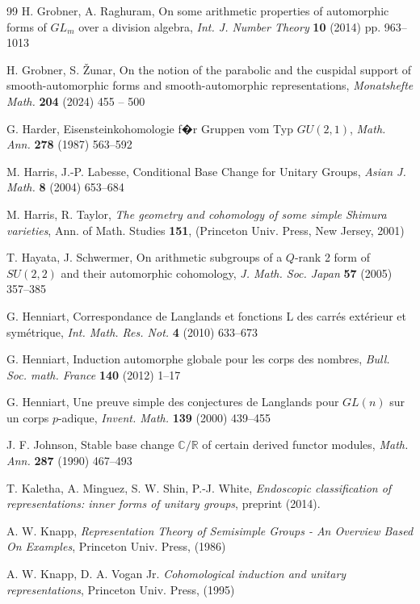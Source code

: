 \documentclass[a4paper,10pt]{amsart}
\theoremstyle{definition}
\numberwithin{equation}{section}
\def\R{\mathbb R}
\def\C{\mathbb C}
\begin{document}
\begin{thebibliography}{99}
 H. Grobner, A. Raghuram, On some arithmetic properties of automorphic forms of $GL_m$ over a division algebra, {\it Int. J. Number Theory} {\bf 10} (2014) pp. 963--1013


 H. Grobner, S. \v Zunar, On the notion of the parabolic and the cuspidal support of smooth-automorphic forms and smooth-automorphic representations, {\it Monatshefte Math.} {\bf 204} (2024) 455 -- 500 


 G. Harder, Eisensteinkohomologie f�r Gruppen vom Typ $GU(2,1)$, {\it Math. Ann.} {\bf 278} (1987) 563--592


 M. Harris, J.-P. Labesse, Conditional Base Change for Unitary Groups, {\it Asian J. Math.} {\bf 8} (2004) 653--684


 M. Harris, R. Taylor, {\it The geometry and cohomology of some simple Shimura varieties}, Ann. of Math. Studies {\bf 151}, (Princeton Univ. Press, New Jersey, 2001)


 T. Hayata, J. Schwermer, On arithmetic subgroups of a $Q$-rank 2 form of $SU(2,2)$ and their automorphic cohomology, {\it J. Math. Soc. Japan} {\bf 57} (2005) 357--385 


 G. Henniart, Correspondance de Langlands et fonctions L des carr\'es ext\'erieur et sym\'etrique, {\it Int. Math. Res. Not.}  {\bf 4} (2010) 633--673

 G. Henniart, Induction automorphe globale pour les corps des nombres, {\it Bull. Soc. math. France} {\bf 140} (2012) 1--17

 G. Henniart, Une preuve simple des conjectures de Langlands pour $GL(n)$ sur un corps $p$-adique, {\it Invent. Math.} \textbf{139} (2000) 439--455

 J. F. Johnson, Stable base change $\C/\R$ of certain derived functor modules, {\it Math. Ann.} {\bf 287} (1990) 467--493

 T. Kaletha, A. Minguez, S. W. Shin, P.-J. White, {\it Endoscopic classification of representations: inner forms of unitary groups}, preprint (2014).

 A. W. Knapp, \emph{Representation Theory of Semisimple Groups - An Overview Based On Examples}, Princeton Univ. Press, (1986)


 A. W. Knapp, D. A. Vogan Jr. \emph{Cohomological induction and unitary representations}, Princeton Univ. Press, (1995)


\end{thebibliography}
\end{document}
